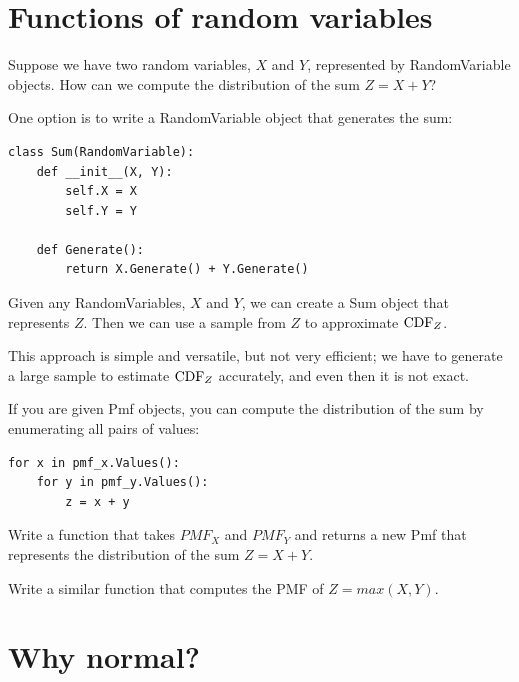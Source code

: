 \documentclass[12pt]{book}
\begin{document}
\section{Functions of random variables}

Suppose we have two random variables, $X$ and $Y$, represented
by RandomVariable objects.
How can we compute the distribution of the sum $Z = X + Y$?

One option is to write a RandomVariable object that generates
the sum:
%
\begin{verbatim}
class Sum(RandomVariable):
    def __init__(X, Y):
        self.X = X
        self.Y = Y

    def Generate():
        return X.Generate() + Y.Generate()
\end{verbatim}

Given any RandomVariables, $X$ and $Y$, we can create a Sum
object that represents $Z$.  Then we can use a sample from $Z$ to
approximate $\mathrm{CDF}_{Z}$.

This approach is simple and versatile, but not very efficient; we
have to generate a large sample to estimate $\mathrm{CDF}_{Z}$ accurately, and
even then it is not exact.



\begin{exercise}

If you are given Pmf objects, you can compute the distribution of
the sum by enumerating all pairs of values:
%
\begin{verbatim}
for x in pmf_x.Values():
    for y in pmf_y.Values():
        z = x + y
\end{verbatim}

Write a function that takes $PMF_{X}$ and
$PMF_{Y}$ and returns a new Pmf that represents the distribution of
the sum $Z = X + Y$.

Write a similar function that computes the PMF of $Z = max(X, Y)$.

\end{exercise}



\section{Why normal?}
\label{why_normal}
\end{document}
